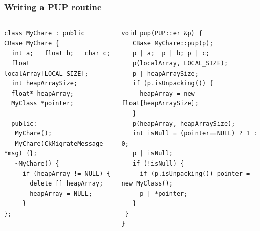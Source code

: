 \begin{frame}[fragile]
\frametitle{Writing a PUP routine}
 \begin{columns}
 \begin{column}{0.5\textwidth}
   \begin{lstlisting}
class MyChare : public CBase_MyChare {
  int a;   float b;   char c;
  float localArray[LOCAL_SIZE];
  int heapArraySize;
  float* heapArray;
  MyClass *pointer;
 
  public:
   MyChare();
   MyChare(CkMigrateMessage *msg) {};
   ~MyChare() {
     if (heapArray != NULL) {
       delete [] heapArray;
       heapArray = NULL;
     }
};
 \end{lstlisting}
 \end{column}
 \begin{column}{0.5\textwidth}
  \begin{lstlisting}
void pup(PUP::er &p) {
   CBase_MyChare::pup(p);
   p | a;  p | b; p | c;
   p(localArray, LOCAL_SIZE);
   p | heapArraySize;
   if (p.isUnpacking()) {
     heapArray = new float[heapArraySize];
   }
   p(heapArray, heapArraySize);
   int isNull = (pointer==NULL) ? 1 : 0;
   p | isNull;
   if (!isNull) {
     if (p.isUnpacking()) pointer = new MyClass();
     p | *pointer;
   }
 }
}
  \end{lstlisting}
  \end{column}
  \end{columns}
\end{frame}


